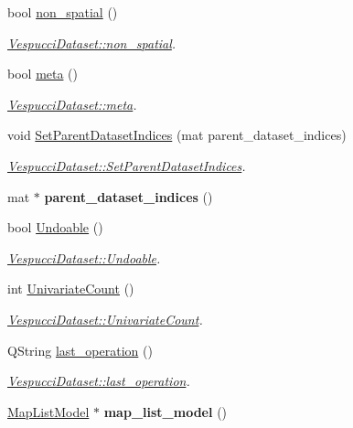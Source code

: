 \begin{DoxyCompactItemize}
\item 
bool \hyperlink{class_vespucci_dataset_afedd02ec813132cb7d6b016c22c7a902}{non\+\_\+spatial} ()
\begin{DoxyCompactList}\small\item\em \hyperlink{class_vespucci_dataset_afedd02ec813132cb7d6b016c22c7a902}{Vespucci\+Dataset\+::non\+\_\+spatial}. \end{DoxyCompactList}\item 
bool \hyperlink{class_vespucci_dataset_a9ce29ea693213307431ddebdedf6fa1b}{meta} ()
\begin{DoxyCompactList}\small\item\em \hyperlink{class_vespucci_dataset_a9ce29ea693213307431ddebdedf6fa1b}{Vespucci\+Dataset\+::meta}. \end{DoxyCompactList}\item 
void \hyperlink{class_vespucci_dataset_a94d860fa93e9ad389f927e58e22ee6d9}{Set\+Parent\+Dataset\+Indices} (mat parent\+\_\+dataset\+\_\+indices)
\begin{DoxyCompactList}\small\item\em \hyperlink{class_vespucci_dataset_a94d860fa93e9ad389f927e58e22ee6d9}{Vespucci\+Dataset\+::\+Set\+Parent\+Dataset\+Indices}. \end{DoxyCompactList}\item 
\hypertarget{class_vespucci_dataset_acb7c814ab4c02c46b9bb22c73a48e3ed}{mat $\ast$ {\bfseries parent\+\_\+dataset\+\_\+indices} ()}\label{class_vespucci_dataset_acb7c814ab4c02c46b9bb22c73a48e3ed}

\item 
bool \hyperlink{class_vespucci_dataset_ac17feefdb4773091c11e1c08274cfacc}{Undoable} ()
\begin{DoxyCompactList}\small\item\em \hyperlink{class_vespucci_dataset_ac17feefdb4773091c11e1c08274cfacc}{Vespucci\+Dataset\+::\+Undoable}. \end{DoxyCompactList}\item 
int \hyperlink{class_vespucci_dataset_a850b757be2abca6b552fbbdd5dba6f09}{Univariate\+Count} ()
\begin{DoxyCompactList}\small\item\em \hyperlink{class_vespucci_dataset_a850b757be2abca6b552fbbdd5dba6f09}{Vespucci\+Dataset\+::\+Univariate\+Count}. \end{DoxyCompactList}\item 
Q\+String \hyperlink{class_vespucci_dataset_a7c13abe9df69967b39a135d8bf97ce89}{last\+\_\+operation} ()
\begin{DoxyCompactList}\small\item\em \hyperlink{class_vespucci_dataset_a7c13abe9df69967b39a135d8bf97ce89}{Vespucci\+Dataset\+::last\+\_\+operation}. \end{DoxyCompactList}\item 
\hypertarget{class_vespucci_dataset_ab3f76db92077ce0744067f1450ea0b7c}{\hyperlink{class_map_list_model}{Map\+List\+Model} $\ast$ {\bfseries map\+\_\+list\+\_\+model} ()}\label{class_vespucci_dataset_ab3f76db92077ce0744067f1450ea0b7c}


\end{DoxyCompactItemize}
